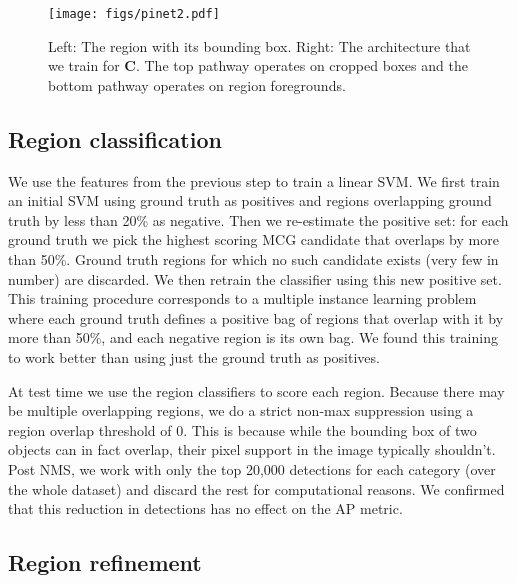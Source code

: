 \documentclass[runningheads]{llncs}
\newcommand\methodC{\textbf{C}}
\begin{document}
\begin{figure}
\centering
\texttt{[image: figs/pinet2.pdf]}
\caption{Left: The region with its bounding box. Right: The architecture that we train for \methodC{}. The top pathway operates on cropped boxes and the bottom pathway operates on region foregrounds. }
\label{fig:net}
\end{figure}




\subsection{Region classification}
\label{sec:classify}
We use the features from the previous step to train a linear SVM. We first train an initial SVM using ground truth as positives and regions overlapping ground truth by less than 20\% as negative. Then we re-estimate the positive set: for each ground truth we pick the highest scoring MCG candidate that overlaps by more than 50\%. Ground truth regions for which no such candidate exists (very few in number) are discarded. We then retrain the classifier using this new positive set. This training procedure corresponds to a multiple instance learning problem where each ground truth defines a positive bag of regions that overlap with it by more than 50\%, and each negative region is its own bag. We found this training to work better than using just the ground truth as positives.

At test time we use the region classifiers to score each region. Because there may be multiple overlapping regions, we do a strict non-max suppression using a region overlap threshold of 0. This is because while the bounding box of two objects can in fact overlap, their pixel support in the image typically shouldn't. Post NMS, we work with only the top 20,000 detections for each category (over the whole dataset) and discard the rest for computational reasons. We confirmed that this reduction in detections has no effect on the AP metric. 
\subsection{Region refinement}
\label{sec:refine}
\end{document}
